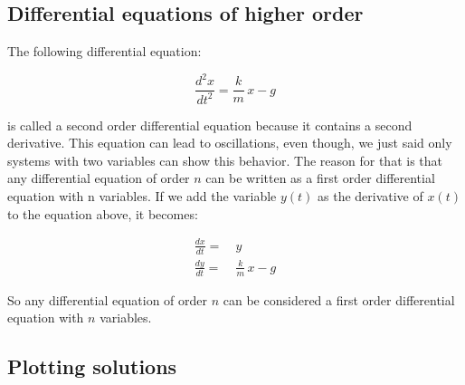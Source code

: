 \documentclass{tufte-book} %
\begin{document}
\FloatBarrier

\subsection{Differential equations of higher order}

The following differential equation:

\begin{equation}
	 \frac{d^2x}{dt^2} = \frac{k}{m} \, x - g \nonumber
\end{equation}

is called a second order differential equation because it contains a second derivative. This equation can lead to oscillations, even though, we just said only systems with two variables can show this behavior. The reason for that is that any  differential equation of order $n$ can be written as a first order differential equation with n variables. If we add the variable $y(t)$ as the derivative of $x(t)$ to the equation above, it becomes:

\begin{align}
	\frac{dx}{dt} =& \: y \nonumber \\
	\frac{dy}{dt} =& \: \frac{k}{m} \, x - g \nonumber
\end{align}

So any differential equation of order $n$ can be considered a first order differential equation with $n$ variables.

\subsection{Plotting solutions}
\end{document}
